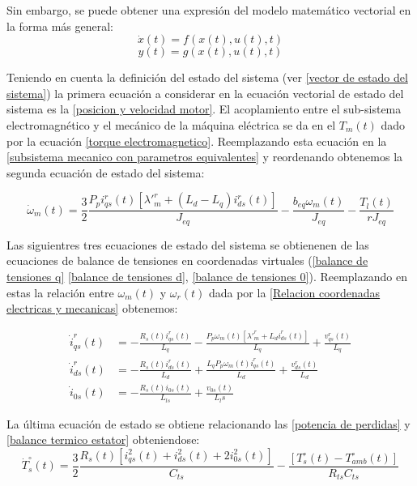 \documentclass[a4paper, 10pt, onecolumn,journal]{ieeeconf}
\begin{document}
Sin embargo, se puede obtener una expresión del modelo matemático vectorial en la forma más general:
\begin{equation*}
    \dot{x}(t) = f(x(t), u(t), t)
\end{equation*}
\begin{equation*}
    y(t) = g(x(t), u(t), t)
\end{equation*}

Teniendo en cuenta la definición del estado del sistema (ver \cref{vector de estado del sistema}) la primera ecuación a considerar en la ecuación vectorial de estado del sistema es la
\cref{posicion y velocidad motor}. El acoplamiento entre el sub-sistema electromagnético y el
mecánico de la máquina eléctrica se da en el $T_m(t)$ dado por la ecuación \cref{torque electromagnetico}.
Reemplazando esta ecuación en la \cref{subsistema mecanico con parametros equivalentes} y reordenando
obtenemos la segunda ecuación de estado del sistema:

\begin{equation}
    \dot{\omega}_m(t) = \frac{3}{2} \frac{P_p i^r_{qs}(t)\left[\lambda'^r_m + (L_d - L_q) i^r_{ds}(t) \right]}{J_{eq}} - \frac{b_{eq}\omega_m(t)}{J_{eq}} - \frac{T_l(t)}{r J_{eq}}
    \label{ecuacion de estado wm}
\end{equation}

Las siguientres tres ecuaciones de estado del sistema se obtienenen de las ecuaciones de balance de tensiones
en coordenadas virtuales (\cref{balance de tensiones q} \cref{balance de tensiones d}, \cref{balance de tensiones 0}).
Reemplazando en estas la relación entre $\omega_m(t)$ y $\omega_r(t)$ dada por la \cref{Relacion coordenadas electricas y mecanicas} obtenemos:

\begin{align}
    \dot{i}^r_{qs}(t) &= -\frac{R_s(t) i^r_{qs}(t)}{L_q} - \frac{P_p \omega_m(t) \left[\lambda'^r_m + L_d i^r_{ds}(t)\right]}{L_q} + \frac{v^r_{qs}(t)}{L_q} \label{ecuacion de estado iqs}\\
    \dot{i}^r_{ds}(t) &= -\frac{R_s(t) i^r_{ds}(t)}{L_d} + \frac{L_q P_p \omega_m(t)i^r_{qs}(t)}{L_d}  + \frac{v^r_{ds}(t)}{L_d} \label{ecuacion de estado ids}\\ 
    \dot{i}_{0s}(t)   &= -\frac{R_s(t) i_{0s}(t)}{L_{ls}} + \frac{v_{0s}(t)}{L_ls}\label{ecuacion de estado i0s}
\end{align}

La última ecuación de estado se obtiene relacionando las \cref{potencia de perdidas} y \cref{balance termico estator} obteniendose:
\begin{equation}
    \dot{T}^\circ_s(t) = \frac{3}{2} \frac{R_s(t) \left[ i_{qs}^2(t) + i_{ds}^2(t) + 2 i_{0s}^2(t) \right]}{C_{ts}} - \frac{\left[T_s^{\circ}(t) - T_{amb}^{\circ}(t)\right]}{R_{ts}C_{ts}} 
    \label{ecuacion de estado Ts}
\end{equation}
\end{document}
